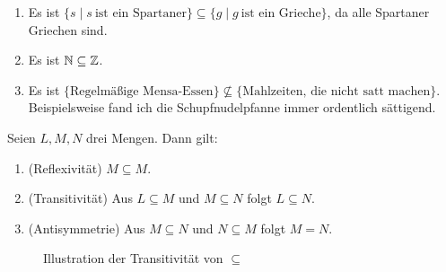 \begin{bsp} \quad
    \begin{enumerate}
        \item Es ist $\{s\mid s\ \text{ist ein Spartaner}\}\subseteq \{g\mid g\ \text{ist ein Grieche}\}$, da alle Spartaner Griechen sind.
        \item Es ist $\mathbb N\subseteq \mathbb Z$.
        \item Es ist $\{\text{Regelmäßige Mensa-Essen}\} \nsubseteq \{ \text{Mahlzeiten, die nicht satt machen}\}$. Beispielsweise fand ich die Schupfnudelpfanne immer ordentlich sättigend.
    \end{enumerate}
\end{bsp}


\begin{satz} \label{teilmengeneig}
    Seien $L,M,N$ drei Mengen. Dann gilt:
    \begin{enumerate}
        \item (Reflexivität) $M\subseteq M$.
        \item (Transitivität) Aus $L\subseteq M$ und $M\subseteq N$ folgt $L\subseteq N$.
        \item (Antisymmetrie) Aus $M \subseteq N$ und $N\subseteq M$ folgt $M=N$.
    \end{enumerate}
    \begin{figure}[ht]
        \centering \caption{Illustration der Transitivität von $\subseteq$}
    \end{figure}
\end{satz}
